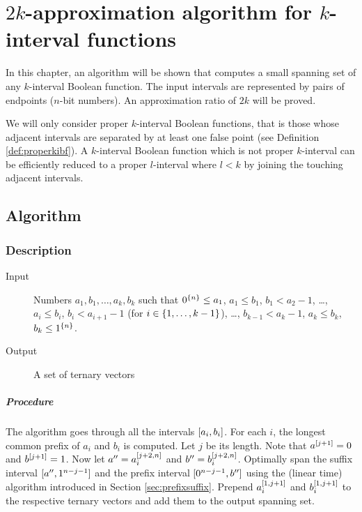 \chapter{\texorpdfstring{$2k$}{2k}-approximation algorithm
for \texorpdfstring{$k$}{k}-interval functions}
\label{chap:2kapprox}


In this chapter,
an algorithm will be shown that computes
a small spanning set
of any $k$-interval Boolean function.
The input intervals are represented by pairs of endpoints
($n$-bit numbers).
An approximation ratio of $2k$ will be proved.

We will only consider
proper $k$-interval Boolean functions,
that is those whose adjacent intervals are separated by
at least one false point
(see Definition \ref{def:properkibf}).
A $k$-interval Boolean function
which is not proper $k$-interval
can be efficiently reduced to a proper $l$-interval
where $l < k$
by joining the touching adjacent intervals.

\section{Algorithm}

\subsection{Description}

\begin{description}
\item[Input] Numbers $a_1, b_1, \ldots, a_k, b_k$
such that
$0^{\{n\}} \leq a_1$,
$a_1 \leq b_1$,
$b_1 < a_2 - 1$,
\ldots,
$a_i \leq b_i$,
$b_i < a_{i+1} - 1$
(for $i \in \{1, \ldots, k-1\}$),
\ldots,
$b_{k-1} < a_k - 1$,
$a_k \leq b_k$,
$b_k \leq 1^{\{n\}}$.

\item[Output] A set of ternary vectors
\end{description}

\paragraph{Procedure}
The algorithm goes through
all the intervals $[a_i, b_i]$.
For each $i$, the longest common prefix of $a_i$ and $b_i$
is computed. Let $j$ be its length.
Note that $a^{[j+1]} = 0$ and $b^{[j+1]} = 1$.
Now let $a'' = a_i^{[j+2, n]}$
and $b'' = b_i^{[j+2, n]}$.
Optimally span the suffix interval
$[a'', 1^{n-j-1}]$
and the prefix interval
$[0^{n-j-1}, b'']$
using the (linear time) algorithm
introduced in Section \ref{sec:prefixsuffix}.
Prepend $a_i^{[1, j+1]}$
and $b_i^{[1, j+1]}$
to the respective ternary vectors
and add them to the output spanning set.

